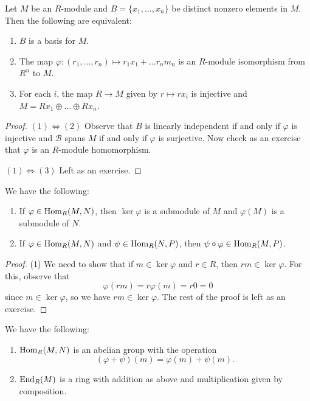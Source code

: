 \begin{definition}
  Let $M$ be an $R$-module and $B = \{x_1, \dots, x_n\}$
  be distinct nonzero elements in $M$. Then the
  following are equivalent:
  \begin{enumerate}
    \item $B$ is a basis for $M$.
    \item The map
      $\varphi : (r_1, \dots, r_n) \mapsto r_1 x_1 + \dots r_n m_n$
      is an $R$-module isomorphism from $R^n$ to $M$.
    \item For each $i$, the map $R \to M$ given by
      $r \mapsto rx_i$ is injective and
      $M = Rx_1 \oplus \dots \oplus Rx_n$.
  \end{enumerate}
\end{definition}

\begin{proof}
  $(1) \Leftrightarrow (2)$
  Observe that $B$ is linearly independent if
  and only if $\varphi$ is injective and $\mathcal{B}$
  spans $M$ if and only if $\varphi$ is surjective.
  Now check as an exercise that $\varphi$ is an
  $R$-module homomorphism.

  $(1) \Leftrightarrow (3)$ Left as an exercise.
\end{proof}

\begin{prop}
  We have the following:
  \begin{enumerate}
    \item If $\varphi \in \operatorname{Hom}_R(M, N)$, then
      $\ker \varphi$ is a submodule of $M$ and
      $\varphi(M)$ is a submodule of $N$.
    \item If $\varphi \in \operatorname{Hom}_R(M, N)$ and
      $\psi \in \operatorname{Hom}_R(N, P)$, then
      $\psi \circ \varphi \in \operatorname{Hom}_R(M, P)$.
  \end{enumerate}
\end{prop}

\begin{proof}
  (1) We need to show that if $m \in \ker \varphi$ and
  $r \in R$, then $rm \in \ker \varphi$. For this,
  observe that
  \[
    \varphi(rm) = r \varphi(m) = r 0 = 0
  \]
  since $m \in \ker \varphi$, so we have
  $rm \in \ker \varphi$. The rest of the proof is
  left as an exercise.
\end{proof}

\begin{prop}
  We have the following:
  \begin{enumerate}
    \item $\operatorname{Hom}_R(M, N)$ is an abelian group with the
      operation
      \[
        (\varphi + \psi)(m) = \varphi(m) + \psi(m).
      \]
    \item $\operatorname{End}_R(M)$ is a ring with addition as above
      and multiplication given by composition.
  \end{enumerate}
\end{prop}

